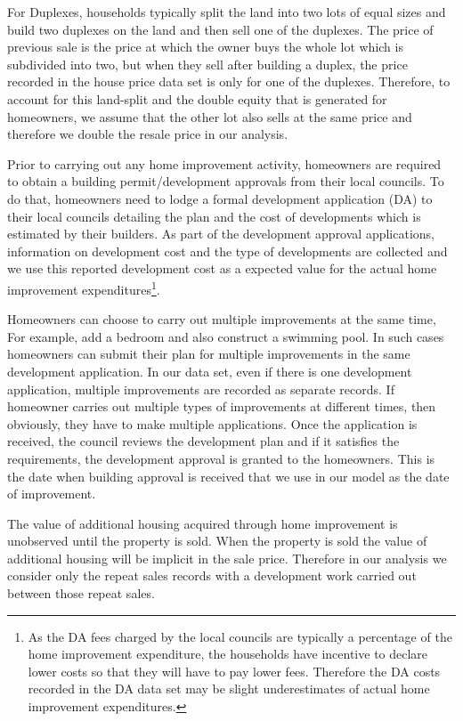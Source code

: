 \documentclass{article}
\begin{document}
For Duplexes, households typically split the land into two lots of equal sizes and build two duplexes on the land and then sell one of the duplexes. The price of previous sale is the price at which the owner buys the whole lot which is subdivided into two, but when they sell after building a duplex, the price recorded in the house price data set is only for one of the duplexes. Therefore, to account for this land-split and the double equity that is generated for homeowners, we assume that the other lot also sells at the same price and therefore we double the resale price in our analysis. 

Prior to carrying out any home improvement activity, homeowners are required to obtain a building permit/development approvals from their local councils. To do that, homeowners need to lodge a formal development application (DA) to their local councils detailing the plan and the cost of developments which is estimated by their builders. As part of the development approval applications, information on development cost and the type of developments are collected and we use this reported development cost as a expected value for the actual home improvement expenditures\footnote{As the DA fees charged by the local councils are typically a percentage of the home improvement expenditure, the households have incentive to declare lower costs so that they will have to pay lower fees. Therefore the DA costs recorded in the DA data set may be slight underestimates of actual home improvement expenditures.}. 

Homeowners can choose to carry out multiple improvements at the same time, For example, add a bedroom and also construct a swimming pool. In such cases homeowners can submit their plan for multiple improvements in the same development application. In our data set, even if there is one development application, multiple improvements are recorded as separate records. If homeowner carries out multiple types of improvements at different times, then obviously, they have to make multiple applications. Once the application is received, the council reviews the development plan and if it satisfies the requirements, the development approval is granted to the homeowners. This is the date when building approval is received that we use in our model as the date of improvement.

The value of additional housing acquired through home improvement is unobserved until the property is sold. When the property is sold the value of additional housing will be implicit in the sale price. Therefore in our analysis we consider only the repeat sales records with a development work carried out between those repeat sales. 
\end{document}
